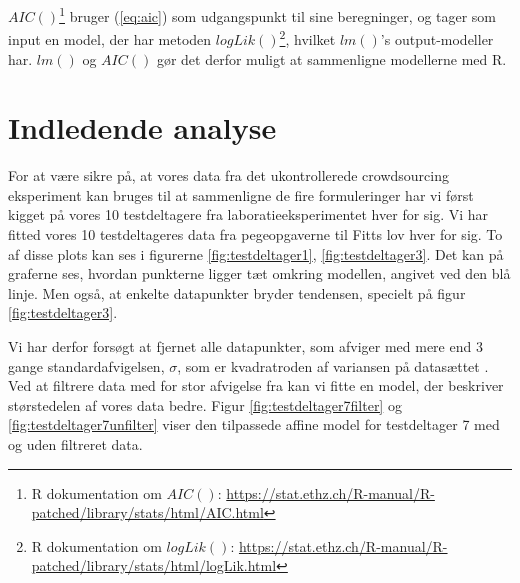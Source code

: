 $AIC()$\footnote{R dokumentation om $AIC()$: \url{https://stat.ethz.ch/R-manual/R-patched/library/stats/html/AIC.html}} bruger (\ref{eq:aic}) som udgangspunkt til sine beregninger, og tager som input en model, der har metoden $logLik()$\footnote{R dokumentation om $logLik()$: \url{https://stat.ethz.ch/R-manual/R-patched/library/stats/html/logLik.html}}, hvilket $lm()$'s output-modeller har. $lm()$ og $AIC()$ gør det derfor muligt at sammenligne modellerne med R.

\section*{Indledende analyse}
For at være sikre på, at vores data fra det ukontrollerede crowdsourcing eksperiment kan bruges til at sammenligne de fire formuleringer har vi først kigget på vores 10 testdeltagere fra laboratieeksperimentet hver for sig. Vi har fitted vores 10 testdeltageres data fra pegeopgaverne til Fitts lov hver for sig. To af disse plots kan ses i figurerne \ref{fig:testdeltager1}, \ref{fig:testdeltager3}.  Det kan på graferne ses, hvordan punkterne ligger tæt omkring modellen, angivet ved den blå linje. Men også, at enkelte datapunkter bryder tendensen, specielt på figur \ref{fig:testdeltager3}.

Vi har derfor forsøgt at fjernet alle datapunkter, som afviger med mere end 3 gange standardafvigelsen, $\sigma$, som er kvadratroden af variansen på datasættet \cite{pearson1894}. Ved at filtrere data med for stor afvigelse fra kan vi fitte en model, der beskriver størstedelen af vores data bedre. Figur \ref{fig:testdeltager7filter} og \ref{fig:testdeltager7unfilter} viser den tilpassede affine model for testdeltager 7 med og uden filtreret data.

